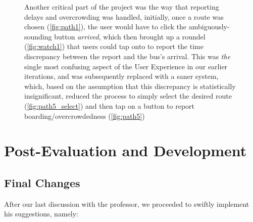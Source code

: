 \documentclass[a4paper, 11pt]{report}
\begin{document}
\begin{figure}[H]
{	}\hspace{0.5pt}
	\caption{
		Another critical part of the project was the way that reporting delays and overcrowding was handled, initially,
		once a route was chosen (\cref{fig:path1}), the user would have to click the ambiguously-sounding button \emph{arrived}, which
		then brought up a roundel (\cref{fig:watch1}) that users could tap onto to report the time discrepancy between the report and
		the bus's arrival. This was \emph{the} single most confusing aspect of the User Experience in our earlier iterations,
		and was subsequently replaced with a saner system, which, based on the assumption that this discrepancy is
		statistically insignificant, reduced the process to simply select the desired route (\cref{fig:path5_select}) and
		then tap on a button to report boarding/overcrowdedness (\cref{fig:path5})}\label{fig:path}
\end{figure}

\chapter{Post-Evaluation and Development}\label{chap:post-evaluation-and-development}

\section{Final Changes}\label{sec:final-changes}

After our last discussion with the professor, we proceeded to swiftly
implement his suggestions, namely:
\end{document}
